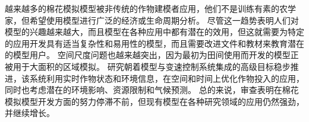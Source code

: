 越来越多的棉花模拟模型被非传统的作物建模者应用，他们不是训练有素的农学家，但希望使用模型进行广泛的经济或生命周期分析。%
尽管这一趋势表明人们对模型的兴趣越来越大，而且模型在各种应用中都有潜在的效用，但这就需要为特定的应用开发具有适当复杂性和易用性的模型，而且需要改进文件和教材来教育潜在的模型用户。%
空间尺度问题也越来越突出，因为最初为田间使用而开发的模型正被用于大面积的区域模拟。%
研究朝着模型与变速控制系统集成的高级目标稳步推进，该系统利用实时作物状态和环境信息，在空间和时间上优化作物投入的应用，同时也考虑潜在的环境影响、资源限制和气候预测。%
总的来说，审查表明在棉花模拟模型开发方面的努力停滞不前，但现有模型在各种研究领域的应用仍然强劲，并继续增长。%

